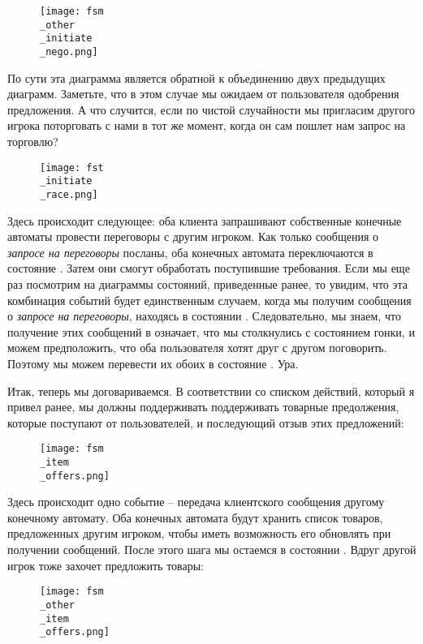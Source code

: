 \begin{figure}[h!]
    \centering
    \texttt{[image: fsm\\\_other\\\_initiate\\\_nego.png]}
\end{figure}

По сути эта диаграмма является обратной к объединению двух предыдущих диаграмм.
Заметьте, что в этом случае мы ожидаем от пользователя одобрения предложения.
А что случится, если по чистой случайности мы пригласим другого игрока поторговать с нами в тот же момент, когда он сам пошлет нам запрос на торговлю?

\begin{figure}[h!]
    \centering
    \texttt{[image: fst\\\_initiate\\\_race.png]}
\end{figure}

Здесь происходит следующее: оба клиента запрашивают собственные конечные автоматы провести переговоры с другим игроком.
Как только сообщения о \emph{запросе на переговоры} посланы, оба конечных автомата переключаются в состояние .
Затем они смогут обработать поступившие требования.
Если мы еще раз посмотрим на диаграммы состояний, приведенные ранее, то увидим, что эта комбинация событий будет единственным случаем, когда мы получим сообщения о \emph{запросе на переговоры}, находясь в состоянии .
Следовательно, мы знаем, что получение этих сообщений в  означает, что мы столкнулись с состоянием гонки, и можем предположить, что оба пользователя хотят друг с другом поговорить.
Поэтому мы можем перевести их обоих в состояние .
Ура.

Итак, теперь мы договариваемся.
В соответствии со списком действий, который я привел ранее, мы должны поддерживать поддерживать товарные предолжения, которые поступают от пользователей, и последующий отзыв этих предложений:

\begin{figure}[h!]
    \centering
    \texttt{[image: fsm\\\_item\\\_offers.png]}
\end{figure}

Здесь происходит одно событие \--- передача клиентского сообщения другому конечному автомату.
Оба конечных автомата будут хранить список товаров, предложенных другим игроком, чтобы иметь возможность его обновлять при получении сообщений.
После этого шага мы остаемся в состоянии .
Вдруг другой игрок тоже захочет предложить товары:

\begin{figure}[h!]
    \centering
    \texttt{[image: fsm\\\_other\\\_item\\\_offers.png]}
\end{figure}

